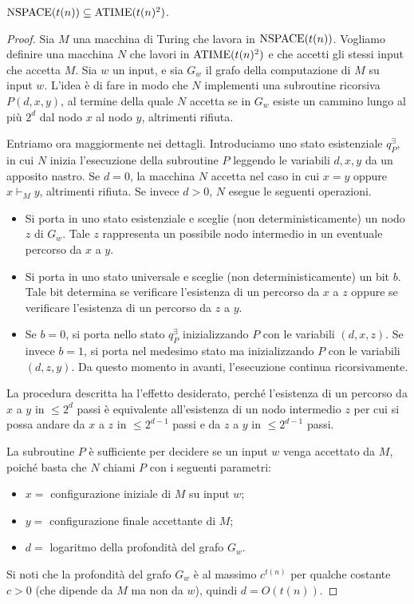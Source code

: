 \begin{teorema}
  \label{thm:nspace-atime}
  $\operatorname{NSPACE}(t(n)) \subseteq \operatorname{ATIME}(t(n)^2)$.
\end{teorema}

\begin{proof}
  Sia $M$ una macchina di Turing che lavora in $\operatorname{NSPACE}(t(n))$. Vogliamo definire una macchina $N$ che lavori in $\operatorname{ATIME}(t(n)^2)$ e che accetti gli stessi input che accetta $M$.
  Sia $w$ un input, e sia $G_w$ il grafo della computazione di $M$ su input $w$.
  L'idea è di fare in modo che $N$ implementi una subroutine ricorsiva $P(d,x,y)$, al termine della quale $N$ accetta se in $G_w$ esiste un cammino lungo al più $2^d$ dal nodo $x$ al nodo $y$, altrimenti rifiuta.
  
  Entriamo ora maggiormente nei dettagli. Introduciamo uno stato esistenziale $q_P^\exists$, in cui $N$ inizia l'esecuzione della subroutine $P$ leggendo le variabili $d,x,y$ da un apposito nastro.
  Se $d=0$, la macchina $N$ accetta nel caso in cui $x=y$ oppure $x\vdash_M y$, altrimenti rifiuta.
  Se invece $d>0$, $N$ esegue le seguenti operazioni.
  \begin{itemize}
    \item Si porta in uno stato esistenziale e sceglie (non deterministicamente) un nodo $z$ di $G_w$.
    Tale $z$ rappresenta un possibile nodo intermedio in un eventuale percorso da $x$ a $y$.
    \item Si porta in uno stato universale e sceglie (non deterministicamente) un bit $b$.
    Tale bit determina se verificare l'esistenza di un percorso da $x$ a $z$ oppure se verificare l'esistenza di un percorso da $z$ a $y$.
    \item Se $b=0$, si porta nello stato $q_P^\exists$ inizializzando $P$ con le variabili $(d,x,z)$. Se invece $b=1$, si porta nel medesimo stato ma inizializzando $P$ con le variabili $(d,z,y)$.
    Da questo momento in avanti, l'esecuzione continua ricorsivamente.
  \end{itemize}
  La procedura descritta ha l'effetto desiderato, perché l'esistenza di un percorso da $x$ a $y$ in $\leq 2^d$ passi è equivalente all'esistenza di un nodo intermedio $z$ per cui si possa andare da $x$ a $z$ in $\leq 2^{d-1}$ passi e da $z$ a $y$ in $\leq 2^{d-1}$ passi.
  
  La subroutine $P$ è sufficiente per decidere se un input $w$ venga accettato da $M$, poiché basta che $N$ chiami $P$ con i seguenti parametri:
  \begin{itemize}
    \renewcommand{\labelitemi}{--}
    \item $x = $ configurazione iniziale di $M$ su input $w$;
    \item $y = $ configurazione finale accettante di $M$;
    \item $d = $ logaritmo della profondità del grafo $G_w$.
  \end{itemize}
  Si noti che la profondità del grafo $G_w$ è al massimo $c^{t(n)}$ per qualche costante $c>0$ (che dipende da $M$ ma non da $w$), quindi $d=O(t(n))$.
  

\end{proof}
